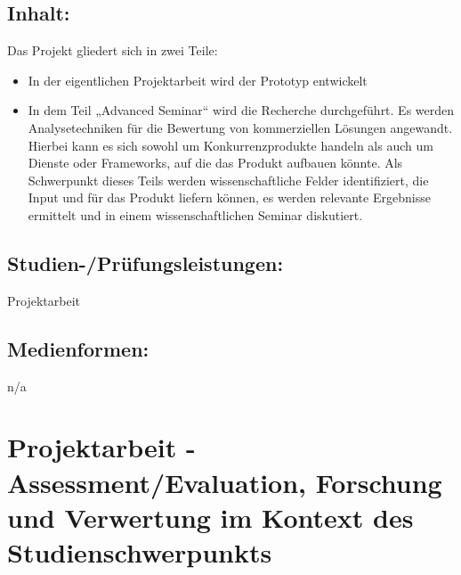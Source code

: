 \section*{Inhalt:}\label{inhalt-8}

Das Projekt gliedert sich in zwei Teile:

\begin{itemize}
\item
  In der eigentlichen Projektarbeit wird der Prototyp entwickelt
\item
  In dem Teil „Advanced Seminar`` wird die Recherche durchgeführt. Es
  werden Analysetechniken für die Bewertung von kommerziellen Lösungen
  angewandt. Hierbei kann es sich sowohl um Konkurrenzprodukte handeln
  als auch um Dienste oder Frameworks, auf die das Produkt aufbauen
  könnte. Als Schwerpunkt dieses Teils werden wissenschaftliche Felder
  identifiziert, die Input und für das Produkt liefern können, es werden
  relevante Ergebnisse ermittelt und in einem wissenschaftlichen Seminar
  diskutiert.
\end{itemize}

\section*{Studien-/Prüfungsleistungen:}\label{studien-pruxfcfungsleistungen-8}

Projektarbeit

\section*{Medienformen:}\label{medienformen-8}

n/a

\chapter{Projektarbeit - Assessment/Evaluation, Forschung und Verwertung
im Kontext des
Studienschwerpunkts}\label{projektarbeit---assessmentevaluation-forschung-und-verwertung-im-kontext-des-studienschwerpunkts}

